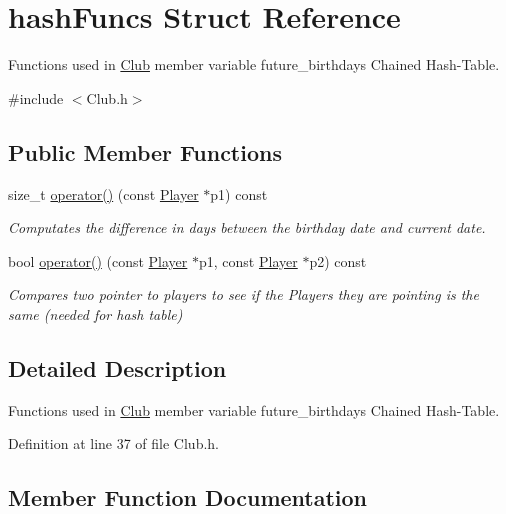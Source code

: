 \hypertarget{structhash_funcs}{}\section{hash\+Funcs Struct Reference}
\label{structhash_funcs}


Functions used in \hyperlink{class_club}{Club} member variable future\+\_\+birthdays Chained Hash-\/\+Table.  




{\ttfamily \#include $<$Club.\+h$>$}

\subsection*{Public Member Functions}
\begin{DoxyCompactItemize}
\item 
size\+\_\+t \hyperlink{structhash_funcs_a521b1888977a80fcd935e8e03c09d916}{operator()} (const \hyperlink{class_player}{Player} $\ast$p1) const
\begin{DoxyCompactList}\small\item\em Computates the difference in days between the birthday date and current date. \end{DoxyCompactList}\item 
bool \hyperlink{structhash_funcs_a9e171ebf004435ea1d1ceb8a30f6a954}{operator()} (const \hyperlink{class_player}{Player} $\ast$p1, const \hyperlink{class_player}{Player} $\ast$p2) const
\begin{DoxyCompactList}\small\item\em Compares two pointer to players to see if the Players they are pointing is the same (needed for hash table) \end{DoxyCompactList}\end{DoxyCompactItemize}


\subsection{Detailed Description}
Functions used in \hyperlink{class_club}{Club} member variable future\+\_\+birthdays Chained Hash-\/\+Table. 

Definition at line 37 of file Club.\+h.



\subsection{Member Function Documentation}
\hypertarget{structhash_funcs_a521b1888977a80fcd935e8e03c09d916}{}\label{structhash_funcs_a521b1888977a80fcd935e8e03c09d916} 
